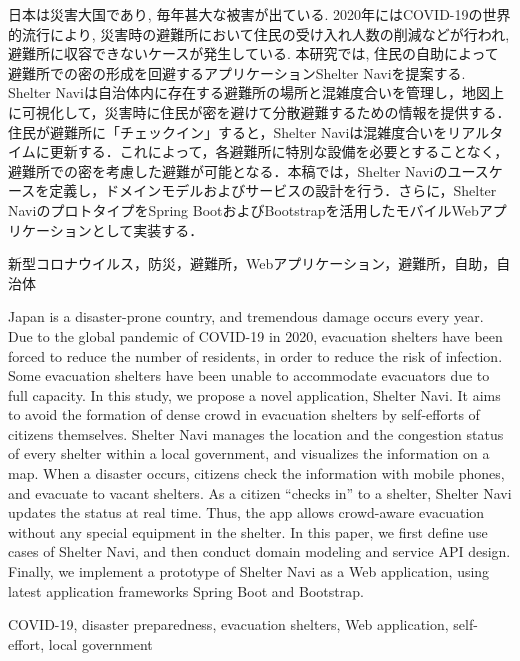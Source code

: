 \documentclass[technicalreport,dvipdfmx]{ieicej}
\begin{document}
\begin{jabstract}
日本は災害大国であり, 毎年甚大な被害が出ている. 2020年にはCOVID-19の世界的流行により, 災害時の避難所において住民の受け入れ人数の削減などが行われ, 避難所に収容できないケースが発生している. 本研究では, 住民の自助によって避難所での密の形成を回避するアプリケーションShelter Naviを提案する. Shelter Naviは自治体内に存在する避難所の場所と混雑度合いを管理し，地図上に可視化して，災害時に住民が密を避けて分散避難するための情報を提供する．住民が避難所に「チェックイン」すると，Shelter Naviは混雑度合いをリアルタイムに更新する．これによって，各避難所に特別な設備を必要とすることなく，避難所での密を考慮した避難が可能となる．本稿では，Shelter Naviのユースケースを定義し，ドメインモデルおよびサービスの設計を行う．さらに，Shelter NaviのプロトタイプをSpring BootおよびBootstrapを活用したモバイルWebアプリケーションとして実装する．
\end{jabstract}
\begin{jkeyword}
新型コロナウイルス，防災，避難所，Webアプリケーション，避難所，自助，自治体
\end{jkeyword}
\begin{eabstract}
Japan is a disaster-prone country, and tremendous damage occurs every year. Due to the global pandemic of COVID-19 in 2020, evacuation shelters have been forced to reduce the number of residents, in order to reduce the risk of infection. Some evacuation shelters have been unable to accommodate evacuators due to full capacity. In this study, we propose a novel application, Shelter Navi. It aims to avoid the formation of dense crowd in evacuation shelters by self-efforts of citizens themselves. Shelter Navi manages the location and the congestion status of every shelter within a local government, and visualizes the information on a map. When a disaster occurs, citizens check the information with mobile phones, and evacuate to vacant shelters. As a citizen “checks in” to a shelter, Shelter Navi updates the status at real time. Thus, the app allows crowd-aware evacuation without any special equipment in the shelter. In this paper, we first define use cases of Shelter Navi, and then conduct domain modeling and service API design. Finally, we implement a prototype of Shelter Navi as a Web application, using latest application frameworks Spring Boot and Bootstrap.
\end{eabstract}
\begin{ekeyword}
COVID-19, disaster preparedness, evacuation shelters, Web application, self-effort, local government
\end{ekeyword}
\maketitle
\end{document}
